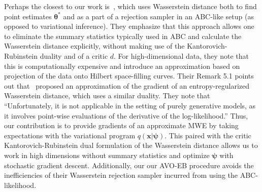 \documentclass[twocolumn,superscriptaddress,aps]{revtex4-1}
\newcommand{\kcnote}[1]{\textcolor{red}{[KC: #1]}}
\newcommand{\bftheta}{{\bm \theta}}
\newcommand{\bfpsi}{{\bm \psi}}
\newcommand{\bfx}{\mathbf{x}}
\theoremstyle{plain}
\begin{document}
Perhaps the closest to our work is~\cite{bernton2017inference}, which uses
Wasserstein distance both to find point estimates $\bftheta^*$ and as a part of
a rejection sampler in an ABC-like setup (as opposed to variational inference).
They emphasize that this approach allows one to eliminate the summary statistics
typically used in ABC and calculate the Wasserstein distance explicitly, without
making use of the Kantorovich-Rubinstein duality and of a critic $d$. For high-dimensional
data, they note that this is computationally expensive and introduce an
approximation based on projection of the data onto Hilbert space-filling curves.
Their Remark 5.1 points out that~\citep{montavon2016wasserstein} proposed an
approximation of the gradient of an entropy-regularized Wasserstein distance,
which uses a similar duality. They note that ``Unfortunately, it is not
applicable in the setting of purely generative models, as it involves point-wise
evaluations of the derivative of the log-likelihood.'' Thus, our contribution is
to provide gradients of an approximate MWE by taking expectations with the
variational program $q(\bfx | \bfpsi)$. This paired with the critic
Kantorovich-Rubinstein dual formulation of the Wasserstein distance
allows us to work in high dimensions without summary statistics and
optimize $\bfpsi$ with stochastic gradient descent. Additionally,
our our AVO-EB procedure avoids the inefficiencies of
their Wasserstein rejection sampler incurred from using the ABC-likelihood.






\end{document}
